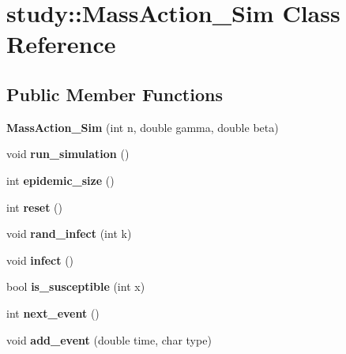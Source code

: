 \hypertarget{classstudy_1_1_mass_action___sim}{\section{study\+:\+:Mass\+Action\+\_\+\+Sim Class Reference}
\label{classstudy_1_1_mass_action___sim}
}
\subsection*{Public Member Functions}
\begin{DoxyCompactItemize}
\item 
\hypertarget{classstudy_1_1_mass_action___sim_a457c102e573262d8ac901b04afa51204}{{\bfseries Mass\+Action\+\_\+\+Sim} (int n, double gamma, double beta)}\label{classstudy_1_1_mass_action___sim_a457c102e573262d8ac901b04afa51204}

\item 
\hypertarget{classstudy_1_1_mass_action___sim_a55ec26c227335774ada962fed9ab75e0}{void {\bfseries run\+\_\+simulation} ()}\label{classstudy_1_1_mass_action___sim_a55ec26c227335774ada962fed9ab75e0}

\item 
\hypertarget{classstudy_1_1_mass_action___sim_a7cde7a0f54ea3593184c7a02179c87c2}{int {\bfseries epidemic\+\_\+size} ()}\label{classstudy_1_1_mass_action___sim_a7cde7a0f54ea3593184c7a02179c87c2}

\item 
\hypertarget{classstudy_1_1_mass_action___sim_a98d53a5168273e89615d44a3ef05eb76}{int {\bfseries reset} ()}\label{classstudy_1_1_mass_action___sim_a98d53a5168273e89615d44a3ef05eb76}

\item 
\hypertarget{classstudy_1_1_mass_action___sim_aa63fdc45e8dd02ca16562391916f9955}{void {\bfseries rand\+\_\+infect} (int k)}\label{classstudy_1_1_mass_action___sim_aa63fdc45e8dd02ca16562391916f9955}

\item 
\hypertarget{classstudy_1_1_mass_action___sim_a5479f5bdf662a2ec82019c7e1638fa0b}{void {\bfseries infect} ()}\label{classstudy_1_1_mass_action___sim_a5479f5bdf662a2ec82019c7e1638fa0b}

\item 
\hypertarget{classstudy_1_1_mass_action___sim_a7a9ebda1f21225bd368b01a891c1d34a}{bool {\bfseries is\+\_\+susceptible} (int x)}\label{classstudy_1_1_mass_action___sim_a7a9ebda1f21225bd368b01a891c1d34a}

\item 
\hypertarget{classstudy_1_1_mass_action___sim_a39a461c352e04858e825cbecf7fb2b28}{int {\bfseries next\+\_\+event} ()}\label{classstudy_1_1_mass_action___sim_a39a461c352e04858e825cbecf7fb2b28}

\item 
\hypertarget{classstudy_1_1_mass_action___sim_afc28fa84d79b6eb515f893c16f2e70f6}{void {\bfseries add\+\_\+event} (double time, char type)}\label{classstudy_1_1_mass_action___sim_afc28fa84d79b6eb515f893c16f2e70f6}

\end{DoxyCompactItemize}
